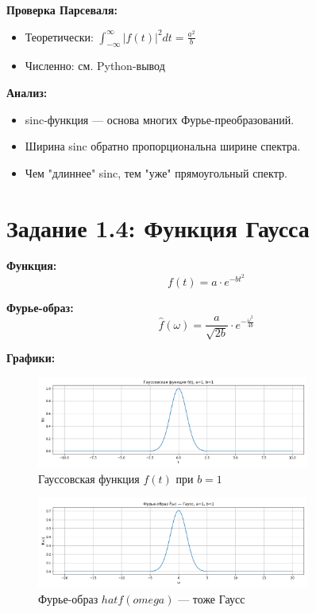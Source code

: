 \textbf{Проверка Парсеваля:}

\begin{itemize}
    \item Теоретически: $\displaystyle \int_{-\infty}^{\infty} |f(t)|^2 dt = \frac{a^2}{b}$
    \item Численно: см. Python-вывод
\end{itemize}

\textbf{Анализ:}

\begin{itemize}
    \item sinc-функция — основа многих Фурье-преобразований.
    \item Ширина sinc обратно пропорциональна ширине спектра.
    \item Чем "длиннее" sinc, тем "уже" прямоугольный спектр.
\end{itemize}

\section*{Задание 1.4: Функция Гаусса}

\textbf{Функция:}
\[
f(t) = a \cdot e^{-b t^2}
\]

\textbf{Фурье-образ:}
\[
\hat{f}(\omega) = \frac{a}{\sqrt{2b}} \cdot e^{-\frac{\omega^2}{4b}}
\]

\textbf{Графики:}

\begin{figure}[h!]
    \centering
    \includegraphics[width=0.8\textwidth]{gauss_function_b1.png}
    \caption{Гауссовская функция $f(t)$ при $b=1$}
\end{figure}

\begin{figure}[h!]
    \centering
    \includegraphics[width=0.8\textwidth]{gauss_spectrum_b1.png}
    \caption{Фурье-образ $hat{f}(omega)$ — тоже Гаусс}
\end{figure}

